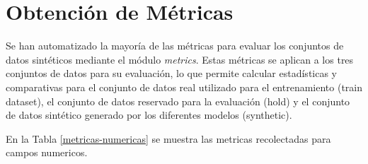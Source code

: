 \section{Obtención de Métricas}
\label{subsec:metricas}

Se han automatizado la mayoría de las métricas para evaluar los conjuntos de datos sintéticos mediante el módulo \emph{metrics}. Estas métricas se aplican a los tres conjuntos de datos para su evaluación, lo que permite calcular estadísticas y comparativas para el conjunto de datos real utilizado para el entrenamiento (train dataset), el conjunto de datos reservado para la evaluación (hold) y el conjunto de datos sintético generado por los diferentes modelos (synthetic). 

En la Tabla \ref{metricas-numericas} se muestra las metricas recolectadas para campos numericos.

